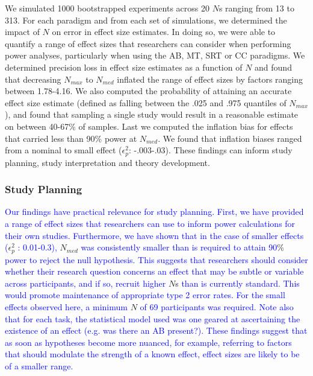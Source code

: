 \documentclass[
  man]{apa6}
\begin{document}
We simulated 1000 bootstrapped experiments across 20 \(N\)s ranging from 13 to 313. For each paradigm and from each set of simulations, we determined the impact of \(N\) on error in effect size estimates. In doing so, we were able to quantify a range of effect sizes that researchers can consider when performing power analyses, particularly when using the AB, MT, SRT or CC paradigms. We determined precision loss in effect size estimates as a function of \(N\) and found that decreasing \(N_{max}\) to \(N_{med}\) inflated the range of effect sizes by factors ranging between 1.78-4.16. We also computed the probability of attaining an accurate effect size estimate (defined as falling between the .025 and .975 quantiles of \(N_{max}\)), and found that sampling a single study would result in a reasonable estimate on between 40-67\% of samples. Last we computed the inflation bias for effects that carried less than 90\% power at \(N_{med}\). We found that inflation biases ranged from a nominal to small effect (\(\epsilon_{p}^2\): -.003-.03). These findings can inform study planning, study interpretation and theory development.

\hypertarget{study-planning}{%
\subsubsection{Study Planning}\label{study-planning}}

\textcolor{blue}{Our findings have practical relevance for study planning. First, we have provided a range of effect sizes that researchers can use to inform power calculations for their own studies. Furthermore, we have shown that in the case of smaller effects (}\(\epsilon_{p}^2\) \textcolor{blue}{: 0.01-0.3),} \(N_{med}\) \textcolor{blue}{was consistently smaller than is required to attain 90}\% \textcolor{blue}{power to reject the null hypothesis. This suggests that researchers should consider whether their research question concerns an effect that may be subtle or variable across participants, and if so, recruit higher} \(N\)s \textcolor{blue}{than is currently standard. This would promote maintenance of appropriate type 2 error rates. For the small effects observed here, a minimum} \(N\) \textcolor{blue}{of 69 participants was required. Note also that for each task, the statistical model used was one geared at ascertaining the existence of an effect (e.g. was there an AB present?). These findings suggest that as soon as hypotheses become more nuanced, for example, referring to factors that should modulate the strength of a known effect, effect sizes are likely to be of a smaller range.}
\end{document}
